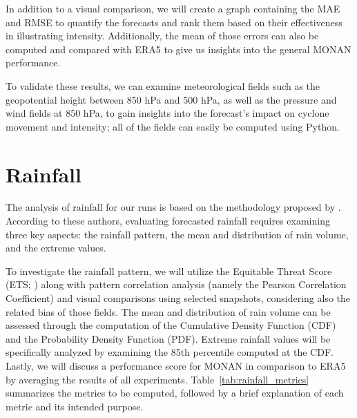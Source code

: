 In addition to a visual comparison, we will create a graph containing the MAE and RMSE to quantify the forecasts and rank them based on their effectiveness in illustrating intensity. Additionally, the mean of those errors can also be computed and compared with ERA5 to give us insights into the general MONAN performance. 

To validate these results, we can examine meteorological fields such as the geopotential height between 850 hPa and 500 hPa, as well as the pressure and wind fields at 850 hPa, to gain insights into the forecast's impact on cyclone movement and intensity; all of the fields can easily be computed using Python. 

\section{Rainfall}

The analysis of rainfall for our runs is based on the methodology proposed by . According to these authors, evaluating forecasted rainfall requires examining three key aspects: the rainfall pattern, the mean and distribution of rain volume, and the extreme values.


To investigate the rainfall pattern, we will utilize the Equitable Threat Score (ETS; ) along with pattern correlation analysis (namely the Pearson Correlation Coefficient) and visual comparisons using selected snapshots, considering also the related bias of those fields. The mean and distribution of rain volume can be assessed through the computation of the Cumulative Density Function (CDF) and the Probability Density Function (PDF). Extreme rainfall values will be specifically analyzed by examining the 85th percentile computed at the CDF. Lastly, we will discuss a performance score for MONAN in comparison to ERA5 by averaging the results of all experiments. Table~\ref{tab:rainfall_metrics} summarizes the metrics to be computed, followed by a brief explanation of each metric and its intended purpose.

